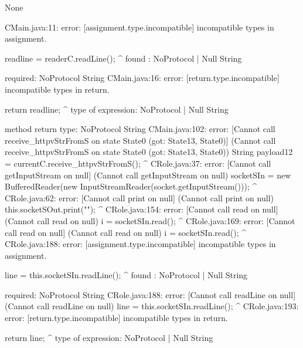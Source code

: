 \lstset{language=,caption=Mungo output}
\begin{code}
None
\end{code}

\lstset{language=,caption=Java Typestate Checker output}
\begin{code}
CMain.java:11: error: [assignment.type.incompatible] incompatible types in assignment.

            readline = readerC.readLine();
                                       ^
  found   : NoProtocol | Null String

  required: NoProtocol String
CMain.java:16: error: [return.type.incompatible] incompatible types in return.

        return readline;
               ^
  type of expression: NoProtocol | Null String

  method return type: NoProtocol String
CMain.java:102: error: [Cannot call receive_httpvStrFromS on state State0 (got: State13, State0)] (Cannot call receive_httpvStrFromS on state State0 (got: State13, State0))
        String payload12 = currentC.receive_httpvStrFromS();
                                                         ^
CRole.java:37: error: [Cannot call getInputStream on null] (Cannot call getInputStream on null)
            socketSIn = new BufferedReader(new InputStreamReader(socket.getInputStream()));
                                                                                      ^
CRole.java:62: error: [Cannot call print on null] (Cannot call print on null)
        this.socketSOut.print("");
                             ^
CRole.java:154: error: [Cannot call read on null] (Cannot call read on null)
                i = socketSIn.read();
                                  ^
CRole.java:169: error: [Cannot call read on null] (Cannot call read on null)
				i = socketSIn.read();
				                  ^
CRole.java:188: error: [assignment.type.incompatible] incompatible types in assignment.

            line = this.socketSIn.readLine();
                                          ^
  found   : NoProtocol | Null String

  required: NoProtocol String
CRole.java:188: error: [Cannot call readLine on null] (Cannot call readLine on null)
            line = this.socketSIn.readLine();
                                          ^
CRole.java:193: error: [return.type.incompatible] incompatible types in return.

        return line;
               ^
  type of expression: NoProtocol | Null String


\end{code}

